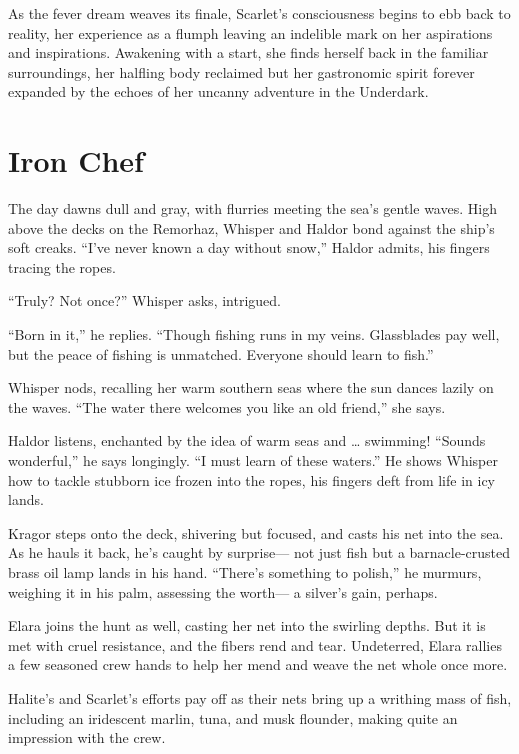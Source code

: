 \documentclass[
  letterpaper,12pt,twoside,twocolumn,openany,
  nodeprecatedcode,bg=full]{dndbook}
\begin{document}
As the fever dream weaves its finale, Scarlet's consciousness begins to
ebb back to reality, her experience as a flumph leaving an indelible
mark on her aspirations and inspirations. Awakening with a start, she
finds herself back in the familiar surroundings, her halfling body
reclaimed but her gastronomic spirit forever expanded by the echoes of
her uncanny adventure in the Underdark.

\section{Iron Chef}\label{iron-chef}

The day dawns dull and gray, with flurries meeting the sea's gentle
waves. High above the decks on the Remorhaz, Whisper and Haldor bond
against the ship's soft creaks. ``I've never known a day without snow,''
Haldor admits, his fingers tracing the ropes.

``Truly? Not once?'' Whisper asks, intrigued.

``Born in it,'' he replies. ``Though fishing runs in my veins.
Glassblades pay well, but the peace of fishing is unmatched. Everyone
should learn to fish.''

Whisper nods, recalling her warm southern seas where the sun dances
lazily on the waves. ``The water there welcomes you like an old
friend,'' she says.

Haldor listens, enchanted by the idea of warm seas and \ldots{}
swimming! ``Sounds wonderful,'' he says longingly. ``I must learn of
these waters.'' He shows Whisper how to tackle stubborn ice frozen into
the ropes, his fingers deft from life in icy lands.

Kragor steps onto the deck, shivering but focused, and casts his net
into the sea. As he hauls it back, he's caught by surprise--- not just
fish but a barnacle-crusted brass oil lamp lands in his hand. ``There's
something to polish,'' he murmurs, weighing it in his palm, assessing
the worth--- a silver's gain, perhaps.

Elara joins the hunt as well, casting her net into the swirling depths.
But it is met with cruel resistance, and the fibers rend and tear.
Undeterred, Elara rallies a few seasoned crew hands to help her mend and
weave the net whole once more.

Halite's and Scarlet's efforts pay off as their nets bring up a writhing
mass of fish, including an iridescent marlin, tuna, and musk flounder,
making quite an impression with the crew.
\end{document}
